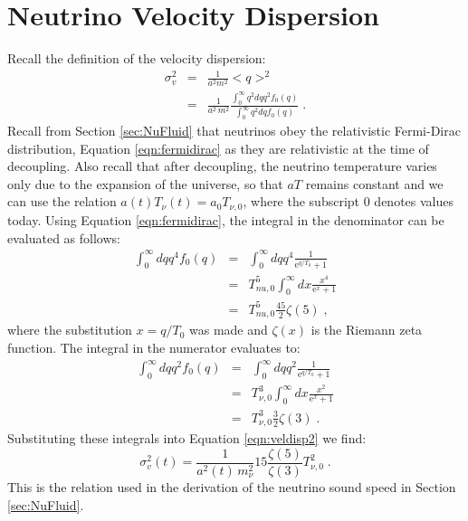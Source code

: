 \documentclass{aastex}
\newcommand{\me}{\mathrm{e}}
\begin{document}
\section{Neutrino Velocity Dispersion}\label{app:AppB}
Recall the definition of the velocity dispersion:
\begin{equation}\label{eqn:veldisp2}
\begin{array}{rcl}
  \sigma_v^2 &=& \frac{1}{a^2 m^2 } < q >^2\\[1em]
  &=& \frac{1}{a^2\, m^2} \frac{ \int_0^\infty q^2 dq q^2 f_0(q) }{
      \int_0^\infty q^2 dq f_0(q) } \;.
\end{array}
\end{equation}
Recall from Section \ref{sec:NuFluid} that neutrinos obey the
relativistic Fermi-Dirac distribution, Equation \eqref{eqn:fermidirac} as they are relativistic at the
time of decoupling.  Also recall that after decoupling, the neutrino
temperature varies only due to the expansion of the universe, so that
$aT$ remains constant and we can use the relation $a(t)T_\nu(t) = a_0T_{\nu,0}$,
where the subscript $0$ denotes values today.  
Using Equation \eqref{eqn:fermidirac}, 
the integral in the denominator can be evaluated as follows:
\begin{equation}\label{eqn:veldisp3}
\begin{array}{rcl}
  \int_0^\infty dq q^4 f_0(q) &=& \int_0^\infty dq q^4
                                  \frac{1}{\me^{q/T_0} + 1} \\[1em]
  &=& T_{nu,0}^5 \int_0^\infty dx \frac{ x^4 }{\me^x +1 } \\[1em]
  &=& T_{nu,0}^5 \frac{45}{2} \zeta (5) \;,
\end{array}
\end{equation}
where the substitution $x=q/T_0$ was made and $\zeta(x)$ is the
Riemann zeta function.  The integral in the numerator evaluates to:
\begin{equation}\label{eqn:veldisp4}
\begin{array}{rcl}
  \int_0^{\infty} dq q^2 f_0(q) &=& \int_0^\infty dq q^2
                                    \frac{1}{\me^{q/T_0}+1}\\[1em] 
 &=& T_{\nu,0}^3 \int_0^\infty dx \frac{x^2}{\me^x+1}\\[1em]
 &=& T_{\nu,0}^3 \frac{3}{2} \zeta(3) \;.
\end{array}
\end{equation}
Substituting these integrals into Equation \eqref{eqn:veldisp2} we find:
\begin{equation}\label{eqn:veldisp52}
  \sigma_v^2(t) = \frac{1}{a^2(t)\,m^2_\nu} 15 \frac{ \zeta(5)
  }{\zeta(3) }  T_{\nu,0}^2 \;.
\end{equation}
This is the relation used in the derivation of the neutrino sound
speed in Section \ref{sec:NuFluid}.
\end{document}
